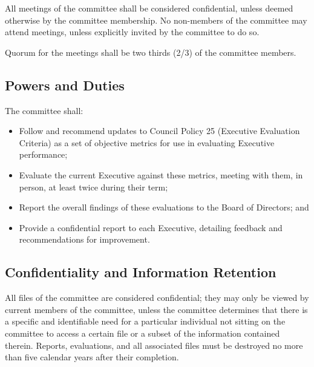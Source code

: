 All meetings of the committee shall be considered confidential, unless deemed
otherwise by the committee membership. No non-members of the committee may
attend meetings, unless explicitly invited by the committee to do so.

Quorum for the meetings shall be two thirds (2/3) of the committee members.

\subsection{Powers and Duties}

The committee shall:
\begin{itemize}
	\item Follow and recommend updates to Council Policy 25 (Executive
	      Evaluation Criteria) as a set of objective metrics for use in
	      evaluating Executive performance;
	\item Evaluate the current Executive against these metrics, meeting with
	      them, in person, at least twice during their term;
	\item Report the overall findings of these evaluations to the Board of
	      Directors; and
	\item Provide a confidential report to each Executive, detailing feedback
	      and recommendations for improvement.

\end{itemize}

\subsection{Confidentiality and Information Retention}

All files of the committee are considered confidential; they may only be viewed by current members of the committee,
unless the committee determines that there is a specific and identifiable need for a particular individual not sitting on the committee to access a certain file or a subset of the information contained therein.
Reports, evaluations, and all associated files must be destroyed no more than five calendar years after their completion.

